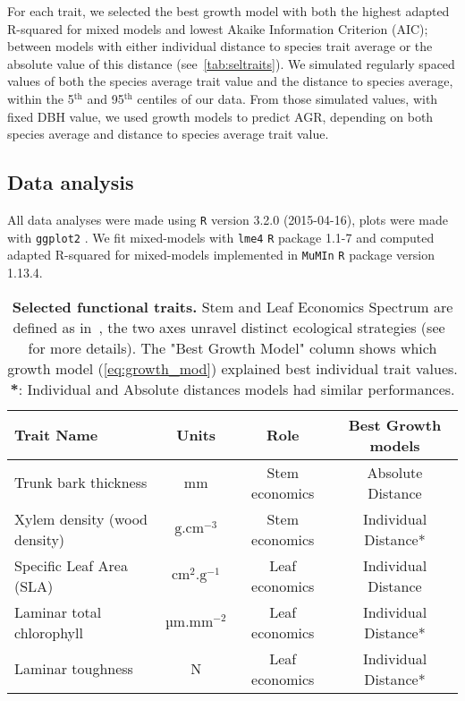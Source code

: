 For each trait, we selected the best growth model with both the highest adapted R-squared for mixed models \citep{nakagawa_general_2013} and lowest Akaike Information Criterion (AIC); between models with either individual distance to species trait average or the absolute value of this distance (see~\autoref{tab:seltraits}). We simulated regularly spaced values of both the species average trait value and the distance to species average, within the 5$^{\text{th}}$ and 95$^{\text{th}}$ centiles of our data. From those simulated values, with fixed DBH value, we used growth models to predict AGR, depending on both species average and distance to species average trait value.

\subsection*{Data analysis}

All data analyses were made using \texttt{R} \citep{R_language} version 3.2.0 (2015-04-16), plots were made with \texttt{ggplot2} \citep{ggplot2_pkg}. We fit mixed-models with \texttt{lme4} \texttt{R} package \citep{lme4_pkg} 1.1-7 and computed adapted R-squared for mixed-models \citep{nakagawa_general_2013} implemented in \texttt{MuMIn} \texttt{R} package \citep{mumin_pkg} version 1.13.4.

\begin{table}
	\begin{center}
		\begin{tabular}{lccc}
		\hline \hline
		Trait Name & Units & Role & Best Growth models \\
		\hline
		Trunk bark thickness & mm & Stem economics & Absolute Distance\\
		Xylem density (wood density) & $\text{g}.\text{cm}^{-3}$ & Stem economics & Individual Distance* \\
		Specific Leaf Area (SLA) & $\text{cm}^2.\text{g}^{-1}$ & Leaf economics & Individual Distance\\
		Laminar total chlorophyll & $\text{µm}.\text{mm}^{-2}$  & Leaf economics & Individual Distance*\\
		Laminar toughness & N & Leaf economics & Individual Distance*\\
		\hline \hline
		\end{tabular}
		\caption{\textbf{Selected functional traits.} Stem and Leaf Economics Spectrum are defined as in~\citep{baraloto_decoupled_2010}, the two axes unravel distinct ecological strategies (see~ for more details). The "Best Growth Model" column shows which growth model (\autoref{eq:growth_mod}) explained best individual trait values. \textbf{*}: Individual and Absolute distances models had similar performances.} 
		\label{tab:seltraits}
	\end{center}
\end{table}
